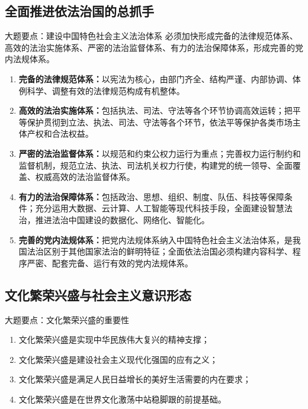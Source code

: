 \documentclass[12pt,a4paper]{ctexart}
\begin{document}
\subsection{全面推进依法治国的总抓手}

\begin{greenlinebox}{大题要点：建设中国特色社会主义法治体系}
必须加快形成完备的法律规范体系、高效的法治实施体系、严密的法治监督体系、有力的法治保障体系，形成完善的党内法规体系。
\begin{enumerate}
  \item \textbf{完备的法律规范体系：}以宪法为核心，由部门齐全、结构严谨、内部协调、体例科学、调整有效的法律规范构成有机整体。
  \item \textbf{高效的法治实施体系：}包括执法、司法、守法等各个环节协调高效运转；把平等保护贯彻到立法、执法、司法、守法等各个环节，依法平等保护各类市场主体产权和合法权益。
  \item \textbf{严密的法治监督体系：}以规范和约束公权力运行为重点；完善权力运行制约和监督机制，规范立法、执法、司法机关权力行使，构建党的统一领导、全面覆盖、权威高效的法治监督体系。
  \item \textbf{有力的法治保障体系：}包括政治、思想、组织、制度、队伍、科技等保障条件；充分运用大数据、云计算、人工智能等现代科技手段，全面建设智慧法治，推进法治中国建设的数据化、网络化、智能化。
  \item \textbf{完善的党内法规体系：}把党内法规体系纳入中国特色社会主义法治体系，是我国法治区别于其他国家法治的鲜明特征；全面依法治国必须构建内容科学、程序严密、配套完备、运行有效的党内法规体系。
\end{enumerate}
\end{greenlinebox}

\subsection{文化繁荣兴盛与社会主义意识形态}

\begin{greenlinebox}{大题要点：文化繁荣兴盛的重要性}
\begin{enumerate}
  \item 文化繁荣兴盛是实现中华民族伟大复兴的精神支撑；
  \item 文化繁荣兴盛是建设社会主义现代化强国的应有之义；
  \item 文化繁荣兴盛是满足人民日益增长的美好生活需要的内在要求；
  \item 文化繁荣兴盛是在世界文化激荡中站稳脚跟的前提基础。
\end{enumerate}
\end{greenlinebox}
\end{document}
